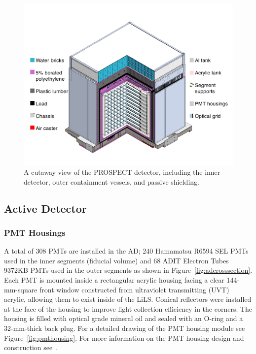 \begin{figure}[t]
	\centering
	\includegraphics[width=0.8\linewidth]{tex/4-prospect-images/AD}
	\caption[Schematic of the PROSPECT detector]{A cutaway view of the PROSPECT detector, including the inner detector, outer containment vessels, and passive shielding.}
	\label{fig:ad}
\end{figure}

\subsection{Active Detector} \label{sec:InnerDetector}

\subsubsection{PMT Housings}

A total of 308 PMTs are installed in the AD; 240 Hamamatsu R6594 SEL PMTs used in the inner segments (fiducial volume) and 68 ADIT Electron Tubes 9372KB PMTs used in the outer segments as shown in Figure~\ref{fig:adcrosssection}.
Each PMT is mounted inside a rectangular acrylic housing facing a clear 144-mm-square front window constructed from ultraviolet transmitting (UVT) acrylic, allowing them to exist inside of the LiLS. 
Conical reflectors were installed at the face of the housing to improve light collection efficiency in the corners. 
The housing is filled with optical grade mineral oil and sealed with an O-ring and a 32-mm-thick back plug. 
For a detailed drawing of the PMT housing module see Figure~\ref{fig:pmthousing}.
For more information on the PMT housing design and construction see~\cite{LongNIM}.

